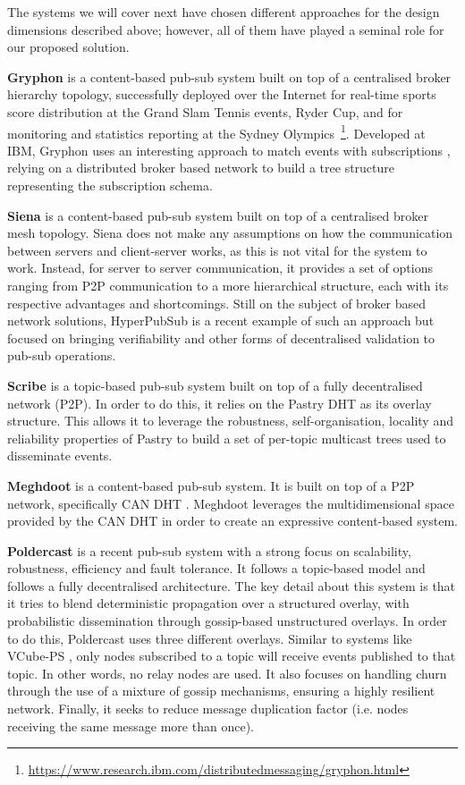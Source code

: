 The systems we will cover next have chosen different approaches for the design
dimensions described above; however, all of them have played a seminal role for
our proposed solution.

\textbf{Gryphon} \cite{Strom1998} is a content-based pub-sub system built on
top of a centralised broker hierarchy topology, successfully deployed over the
Internet for real-time sports score distribution at the Grand Slam Tennis
events, Ryder Cup, and for monitoring and statistics reporting at the Sydney
Olympics~\footnote{\url{https://www.research.ibm.com/distributedmessaging/gryphon.html}}.
Developed at IBM, Gryphon uses an interesting approach to match events with
subscriptions \cite{Aguilera1999}, relying on a distributed broker based
network to build a tree structure representing the subscription schema. 

\textbf{Siena} \cite{Carzaniga2003} is a content-based pub-sub system built on
top of a centralised broker mesh topology. Siena does not make any assumptions
on how the communication between servers and client-server works, as this is
not vital for the system to work. Instead, for server to server communication,
it provides a set of options ranging from P2P communication to a more
hierarchical structure, each with its respective advantages and shortcomings.
Still on the subject of broker based network solutions, HyperPubSub
\cite{Zupan2017} is a recent example of such an approach but focused on
bringing verifiability and other forms of decentralised validation to pub-sub
operations.

\textbf{Scribe} \cite{Castro2002} is a topic-based pub-sub system built on top
of a fully decentralised network (P2P). In order to do this, it relies on
the Pastry DHT \cite{Rowstron2001} as its overlay
structure. This allows it to leverage the robustness, self-organisation,
locality and reliability properties of Pastry to build a set of per-topic
multicast trees used to disseminate events.

\textbf{Meghdoot} \cite{Gupta2004} is a content-based pub-sub system.  It is
built on top of a P2P network, specifically CAN DHT \cite{Ratnasamy2001a}.
Meghdoot leverages the multidimensional space provided by the CAN DHT in order
to create an expressive content-based system.

\textbf{Poldercast} \cite{Setty2012} is a recent pub-sub system with a strong
focus on scalability, robustness, efficiency and fault tolerance. It follows a
topic-based model and follows a fully decentralised architecture. The key
detail about this system is that it tries to blend deterministic propagation
over a structured overlay, with probabilistic dissemination through
gossip-based unstructured overlays. In order to do this, Poldercast uses three
different overlays.\cite{Voulgaris2013}\cite{Voulgaris2005a} Similar to systems
like VCube-PS \cite{DeAraujo2017}, only nodes subscribed to a topic will
receive events published to that topic. In other words, no relay nodes are
used. It also focuses on handling churn through the use of a mixture of gossip
mechanisms, ensuring a highly resilient network.  Finally, it seeks to reduce
message duplication factor (i.e. nodes receiving the same message more than
once).

